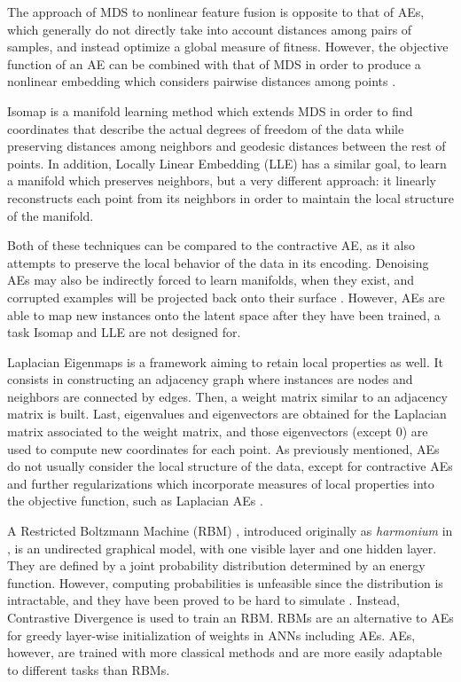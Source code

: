 The approach of MDS to nonlinear feature fusion is opposite to that of AEs, which generally do not directly take into account distances among pairs of samples, and instead optimize a global measure of fitness. However, the objective function of an AE can be combined with that of MDS in order to produce a nonlinear embedding which considers pairwise distances among points \cite{EmbeddingAEReg}.

Isomap \cite{Isomap} is a manifold learning method which extends MDS in order to find coordinates that describe the actual degrees of freedom of the data while preserving distances among neighbors and geodesic distances between the rest of points. In addition, Locally Linear Embedding (LLE) \cite{LLE} has a similar goal, to learn a manifold which preserves neighbors, but a very different approach: it linearly reconstructs each point from its neighbors in order to maintain the local structure of the manifold.

Both of these techniques can be compared to the contractive AE, as it also attempts to preserve the local behavior of the data in its encoding. Denoising AEs may also be indirectly forced to learn manifolds, when they exist, and corrupted examples will be projected back onto their surface \cite{vincent2010stacked}. However, AEs are able to map new instances onto the latent space after they have been trained, a task Isomap and LLE are not designed for.

Laplacian Eigenmaps \cite{LaplacianEigenmaps} is a framework aiming to retain local properties as well. It consists in constructing an adjacency graph where instances are nodes and neighbors are connected by edges. Then, a weight matrix similar to an adjacency matrix is built. Last, eigenvalues and eigenvectors are obtained for the Laplacian matrix associated to the weight matrix, and those eigenvectors (except 0) are used to compute new coordinates for each point. As previously mentioned, AEs do not usually consider the local structure of the data, except for contractive AEs and further regularizations which incorporate measures of local properties into the objective function, such as Laplacian AEs \cite{LaplacianAE}.

A Restricted Boltzmann Machine (RBM) \cite{DLBookRBM}, introduced originally as \textit{harmonium} in \cite{Harmonium}, is an undirected graphical model, with one visible layer and one hidden layer. They are defined by a joint probability distribution determined by an energy function.
However, computing probabilities is unfeasible since the distribution is intractable, and they have been proved to be hard to simulate \cite{RBMHard}. Instead, Contrastive Divergence \cite{ContrastiveDivergence} is used to train an RBM. RBMs are an alternative to AEs for greedy layer-wise initialization of weights in ANNs including AEs. AEs, however, are trained with more classical methods and are more easily adaptable to different tasks than RBMs.

